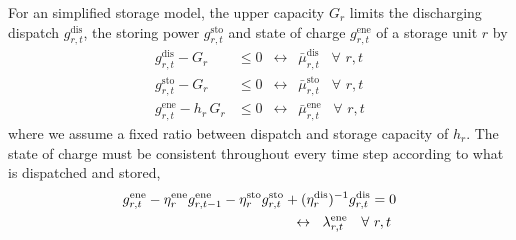 \documentclass[11pt,twocolumn]{article}
\newcommand{\resultsin}[1]{\hspace{6pt} \leftrightarrow  \hspace{6pt} #1}
\newcommand{\Forall}[1]{\hspace{10pt} \forall \,\, #1 }
\newcommand{\pdv}[2]{\frac{\partial #1}{\partial #2}}
\newcommand{\storage}{g_{r,t}}
\newcommand{\storagedispatch}{\storage^\text{dis}}
\newcommand{\storagecharge}{\storage^\text{sto}}
\newcommand{\storagesoc}{\storage^\text{ene}}
\newcommand{\storageprevioussoc}{g_{r,t-1}^\text{ene}}
\newcommand{\efficiency}{\eta_{r}}
\newcommand{\efficiencydispatch}{\efficiency^\text{dis}}
\newcommand{\efficiencycharge}{\efficiency^\text{sto}}
\newcommand{\efficiencysoc}{\efficiency^\text{ene}}
\newcommand{\capitalpricestorage}{c_r}
\newcommand{\capacitystorage}{G_r}
\newcommand{\muupperstoragedispatch}{\bar{\mu}_{r,t}^\text{dis}}
\newcommand{\muupperstoragecharge}{\bar{\mu}_{r,t}^\text{sto}}
\newcommand{\muupperstoragesoc}{\bar{\mu}_{r,t}^\text{ene}}
\newcommand{\mustateofcharge}{\lambda^\text{ene}_{r,t}}
\newcommand{\lagrangian}{\mathcal{L}}
\begin{document}
For an simplified storage model, the upper capacity $\capacitystorage$ limits the discharging dispatch $\storagedispatch$, the storing power $\storagecharge$ and state of charge $\storagesoc$ of a storage unit $r$ by
\begin{align}
    \storagedispatch - \capacitystorage   & \le 0  \resultsin{\muupperstoragedispatch} \Forall{r,t} \\
    \storagecharge - \capacitystorage     & \le 0  \resultsin{\muupperstoragecharge} \Forall{r,t}   \\
    \storagesoc - h_r \, \capacitystorage & \le 0  \resultsin{\muupperstoragesoc} \Forall{r,t}
\end{align}
where we assume a fixed ratio between dispatch and storage capacity of $h_r$.
The state of charge must be consistent throughout every time step according to what is dispatched and stored,
\begin{align}
    \notag
    \storagesoc - \efficiencysoc \storageprevioussoc - \efficiencycharge \storagecharge & + (\efficiencydispatch)^{-1} \storagedispatch = 0 \\
                                                                                        & \resultsin{\mustateofcharge} \Forall{r,t}
\end{align}
\end{document}
